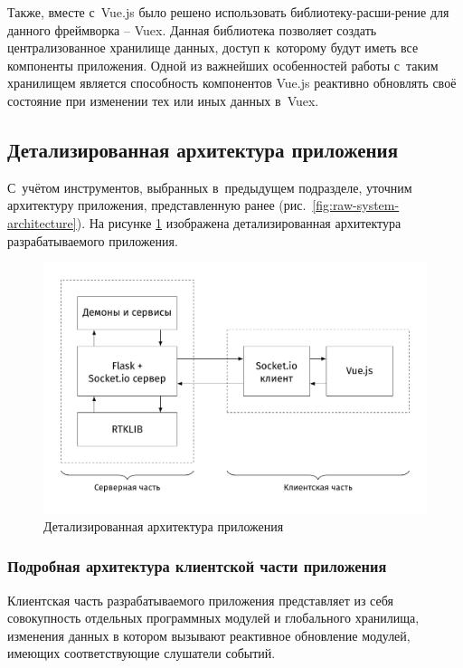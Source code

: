 \documentclass[pta]{../../../scs-iam}
\begin{document}
Также, вместе с~Vue.js было решено использовать библиотеку-расши-рение для данного фреймворка -- Vuex. Данная библиотека позволяет создать централизованное хранилище данных, доступ к~которому будут иметь все компоненты приложения. Одной из важнейших особенностей работы с~таким хранилищем является способность компонентов Vue.js реактивно обновлять своё состояние при изменении тех или иных данных в~Vuex.

\subsection{Детализированная архитектура приложения}
\label{subsec:app-architecture}

С~учётом инструментов, выбранных в~предыдущем подразделе, уточним архитектуру приложения, представленную ранее (рис.~\ref{fig:raw-system-architecture}). На рисунке \ref{fig:complete-system-architecture} изображена детализированная архитектура разрабатываемого приложения.

\begin{figure}[h!]
  \centering
  \setlength{\fboxsep}{5pt}
  \includegraphics[width=\textwidth]{../../../img/tikz/system-architecture/pic_sans_no-border}
  \caption{Детализированная архитектура приложения}\label{fig:complete-system-architecture}
\end{figure}

\subsubsection{Подробная архитектура клиентской части приложения}

Клиентская часть разрабатываемого приложения представляет из себя совокупность отдельных программных модулей и глобального хранилища, изменения данных в котором вызывают реактивное обновление модулей, имеющих соответствующие слушатели событий.
\end{document}
